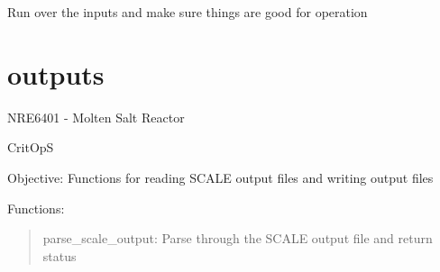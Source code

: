 \documentclass[letterpaper,10pt,english]{sphinxmanual}
\begin{document}

\begin{fulllineitems}
\label{\detokenize{readinputs:critops.readinputs.check_inputs}}
Run over the inputs and make sure things are good for operation

\end{fulllineitems}



\chapter{outputs}
\label{\detokenize{outputs::doc}}\label{\detokenize{outputs:module-critops.outputs}}\label{\detokenize{outputs:outputs}}
NRE6401 - Molten Salt Reactor

CritOpS

Objective: Functions for reading SCALE output files and writing output files

Functions:
\begin{quote}

parse\_scale\_output: Parse through the SCALE output file and return status
\end{quote}
\end{document}

